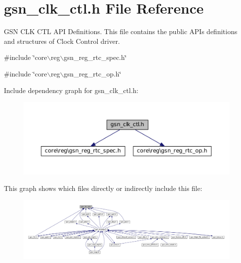 \hypertarget{a00477}{
\section{gsn\_\-clk\_\-ctl.h File Reference}
\label{a00477}
}


GSN CLK CTL API Definitions. This file contains the public APIs definitions and structures of Clock Control driver.  


{\ttfamily \#include \char`\"{}core$\backslash$reg$\backslash$gsn\_\-reg\_\-rtc\_\-spec.h\char`\"{}}\par
{\ttfamily \#include \char`\"{}core$\backslash$reg$\backslash$gsn\_\-reg\_\-rtc\_\-op.h\char`\"{}}\par
Include dependency graph for gsn\_\-clk\_\-ctl.h:
\nopagebreak
\begin{figure}[H]
\begin{center}
\leavevmode
\includegraphics[width=400pt]{a00701}
\end{center}
\end{figure}
This graph shows which files directly or indirectly include this file:
\nopagebreak
\begin{figure}[H]
\begin{center}
\leavevmode
\includegraphics[width=400pt]{a00702}
\end{center}
\end{figure}
